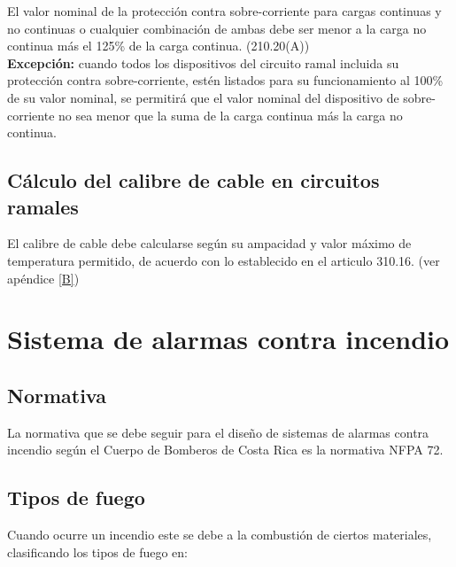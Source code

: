 El valor nominal de la protección contra sobre-corriente para cargas continuas y no continuas o cualquier combinación de ambas debe ser menor a la carga no continua más el 125\% de la carga continua. (210.20(A)) \cite{NFPA70} \\

\textbf{Excepción:} cuando todos los dispositivos del circuito ramal incluida su protección contra sobre-corriente, estén listados para su funcionamiento al 100\% de su valor nominal, se permitirá que el valor nominal del dispositivo de sobre-corriente no sea menor que la suma de la carga continua más la carga no continua.


\subsection{Cálculo del calibre de cable en circuitos ramales}

El calibre de cable debe calcularse según su ampacidad y valor máximo de temperatura permitido, de acuerdo con lo establecido en el articulo 310.16. (ver apéndice \ref{B}) \cite{NFPA70}






\newpage




\section{Sistema de alarmas contra incendio}


\subsection{Normativa}

La normativa que se debe seguir para el diseño de sistemas de alarmas contra incendio según el Cuerpo de Bomberos de Costa Rica es la normativa NFPA 72. \cite{Bomberos}


\subsection{Tipos de fuego}

Cuando ocurre un incendio este se debe a la combustión de ciertos materiales, clasificando los tipos de fuego en: \cite{Bomberos}\\

